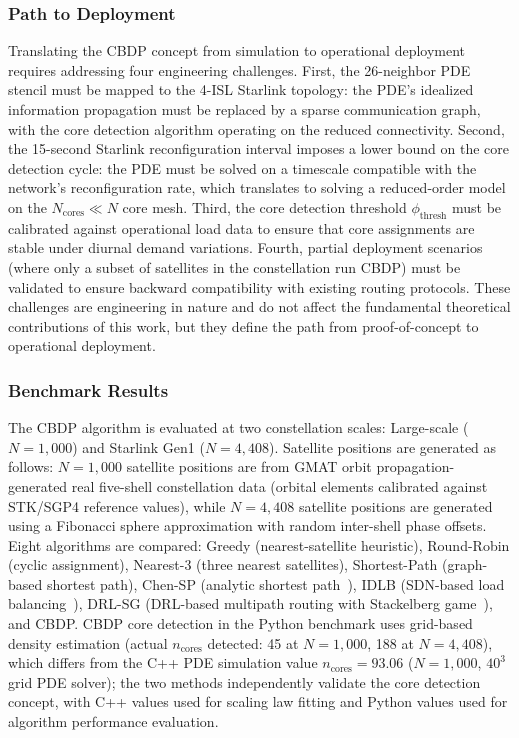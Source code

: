 \documentclass[sn-nature,pdflatex]{sn-jnl}
\begin{document}
\subsubsection{Path to Deployment}

Translating the CBDP concept from simulation to operational deployment requires addressing four engineering challenges.
First, the 26-neighbor PDE stencil must be mapped to the 4-ISL Starlink topology: the PDE's idealized information propagation must be replaced by a sparse communication graph, with the core detection algorithm operating on the reduced connectivity.
Second, the 15-second Starlink reconfiguration interval imposes a lower bound on the core detection cycle: the PDE must be solved on a timescale compatible with the network's reconfiguration rate, which translates to solving a reduced-order model on the $N_{\text{cores}} \ll N$ core mesh.
Third, the core detection threshold $\phi_{\text{thresh}}$ must be calibrated against operational load data to ensure that core assignments are stable under diurnal demand variations.
Fourth, partial deployment scenarios (where only a subset of satellites in the constellation run CBDP) must be validated to ensure backward compatibility with existing routing protocols.
These challenges are engineering in nature and do not affect the fundamental theoretical contributions of this work, but they define the path from proof-of-concept to operational deployment.

\subsubsection{Benchmark Results}

The CBDP algorithm is evaluated at two constellation scales: Large-scale ($N=1,000$) and Starlink Gen1 ($N=4,408$).
Satellite positions are generated as follows: $N=1,000$ satellite positions are from GMAT orbit propagation-generated real five-shell constellation data (orbital elements calibrated against STK/SGP4 reference values), while $N=4,408$ satellite positions are generated using a Fibonacci sphere approximation with random inter-shell phase offsets.
Eight algorithms are compared: Greedy (nearest-satellite heuristic), Round-Robin (cyclic assignment), Nearest-3 (three nearest satellites), Shortest-Path (graph-based shortest path), Chen-SP (analytic shortest path~\cite{chen_2024_jsac}), IDLB (SDN-based load balancing~\cite{roth_2025_idlb}), DRL-SG (DRL-based multipath routing with Stackelberg game~\cite{li_2025_tmc}), and CBDP.
CBDP core detection in the Python benchmark uses grid-based density estimation (actual $n_{\text{cores}}$ detected: 45 at $N=1,000$, 188 at $N=4,408$), which differs from the C++ PDE simulation value $n_{\text{cores}}=93.06$ ($N=1,000$, $40^3$ grid PDE solver); the two methods independently validate the core detection concept, with C++ values used for scaling law fitting and Python values used for algorithm performance evaluation.
\end{document}
